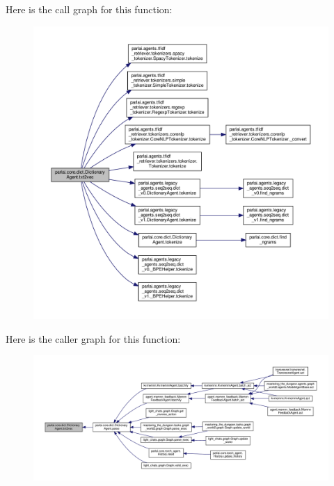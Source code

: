 Here is the call graph for this function\+:
\nopagebreak
\begin{figure}[H]
\begin{center}
\leavevmode
\includegraphics[width=350pt]{classparlai_1_1core_1_1dict_1_1DictionaryAgent_abc3baf742422fc7cdaece698224709d4_cgraph}
\end{center}
\end{figure}
Here is the caller graph for this function\+:
\nopagebreak
\begin{figure}[H]
\begin{center}
\leavevmode
\includegraphics[width=350pt]{classparlai_1_1core_1_1dict_1_1DictionaryAgent_abc3baf742422fc7cdaece698224709d4_icgraph}
\end{center}
\end{figure}
\mbox{\label{classparlai_1_1core_1_1dict_1_1DictionaryAgent_af2eeb50b2cd6cf3a8ca817b729ec7486}} 
